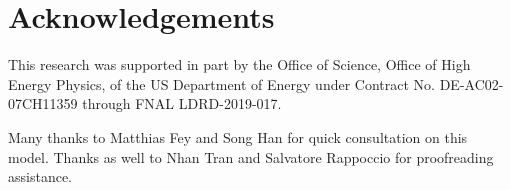 \documentclass{article}
\begin{document}
\section{Acknowledgements}

This research was supported in part by the Office of Science, Office of
High Energy Physics, of the US Department of Energy under Contract No. DE-AC02-07CH11359 through FNAL LDRD-2019-017.

Many thanks to Matthias Fey and Song Han for quick consultation on this model.
Thanks as well to Nhan Tran and Salvatore Rappoccio for proofreading assistance.

  
 
\end{document}
